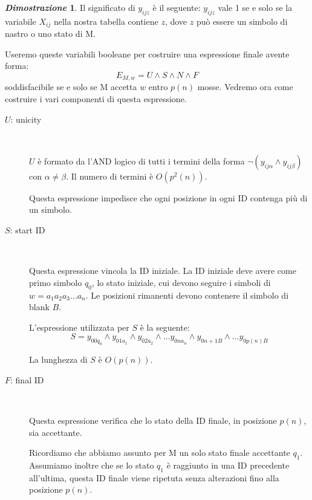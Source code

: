 \documentclass[12pt]{article}
\theoremstyle{definition}
\newtheorem*{myproof}{\em Dimostrazione}
\begin{document}
\begin{myproof}
Il significato di \(y_{ijz}\) \`e il seguente: \(y_{ijz}\) vale 1 se e solo se la variabile \(X_{ij}\) nella
nostra tabella contiene \(z\), dove \(z\) pu\`o essere un simbolo di nastro o uno stato di M.

Useremo queste variabili booleane per costruire una espressione finale avente forma: \[
E_{M,w} = U \land S \land N \land F
\] soddisfacibile se e solo se M accetta \(w\) entro \(p(n)\) mosse.
Vedremo ora come costruire i vari componenti di questa espressione.

\begin{description}

  \item[\(U\): unicity]\ \newline

    \(U\) \`e formato da l'AND logico di tutti i termini della forma \(\lnot(y_{ij\alpha} \land y_{ij\beta})\)
    con \(\alpha \neq \beta \). Il numero di termini \`e \(O(p^2(n))\). \newline

    Questa espressione impedisce che ogni posizione in ogni ID contenga pi\`u di un simbolo.
    \newline

  \item[\(S\): start ID]\ \newline

    Questa espressione vincola la ID iniziale. La ID iniziale deve avere come primo simbolo \(q_0\),
    lo stato iniziale, cui devono seguire i simboli di \(w = a_1a_2a_3 \ldots a_n\). Le posizioni rimanenti
    devono contenere il simbolo di blank \(B\). \newline

    L'espressione utilizzata per \(S\) \`e la seguente: \[
    S = y_{00q_0} \land y_{01a_1} \land y_{02a_2} \land \ldots y_{0na_n} \land y_{0n+1B} \land \ldots y_{0p(n)B}
    \]

    La lunghezza di \(S\) \`e \(O(p(n))\).
    \newline

  \item[\(F\): final ID]\ \newline

    Questa espressione verifica che lo stato della ID finale, in posizione \(p(n)\),
    sia accettante.
    \newline

    Ricordiamo che abbiamo assunto per M un solo stato finale accettante \(q_1\).
    Assumiamo inoltre che se lo stato \(q_1\) \`e raggiunto in una ID precedente all'ultima,
    questa ID finale viene ripetuta senza alterazioni fino alla posizione \(p(n)\).
    \newline


\end{description}
\end{myproof}
\end{document}
